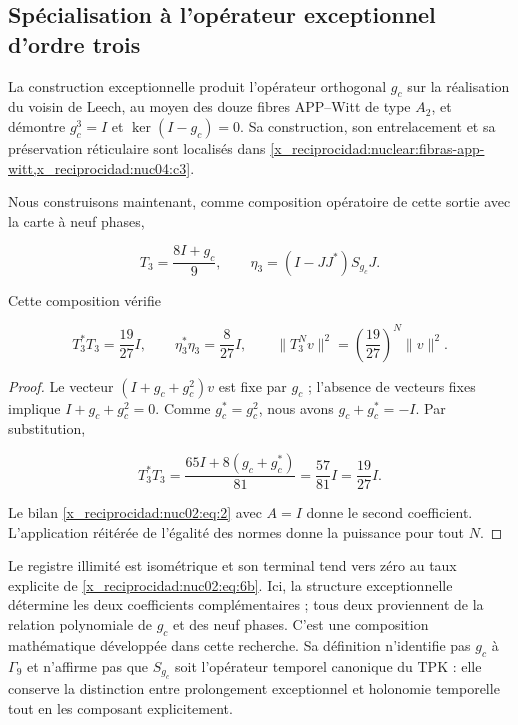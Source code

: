 \subsection{Spécialisation à l’opérateur exceptionnel d’ordre trois}

La construction exceptionnelle produit l’opérateur orthogonal \(g_c\) sur la réalisation du voisin de Leech, au moyen des douze fibres APP–Witt de type \(A_2\), et démontre \(g_c^3=I\) et \(\ker(I-g_c)=0\). Sa construction, son entrelacement et sa préservation réticulaire sont localisés dans \cref{x_reciprocidad:nuclear:fibras-app-witt,x_reciprocidad:nuc04:c3}.

Nous construisons maintenant, comme composition opératoire de cette sortie avec la carte à neuf phases,

\[
T_3=\frac{8I+g_c}{9},\qquad
\eta_3=(I-JJ^*)S_{g_c}J.
\]

\begin{corollary}
Cette composition vérifie

\begin{equation}
\boxed{T_3^*T_3=\frac{19}{27}I,\qquad
\eta_3^*\eta_3=\frac8{27}I,\qquad
\|T_3^Nv\|^2=\left(\frac{19}{27}\right)^N\|v\|^2.}\label{x_reciprocidad:nuc02:eq:6b}
\end{equation}
\end{corollary}

\begin{proof}
Le vecteur \((I+g_c+g_c^2)v\) est fixe par \(g_c\) ; l’absence de vecteurs fixes implique \(I+g_c+g_c^2=0\). Comme \(g_c^*=g_c^2\), nous avons \(g_c+g_c^*=-I\). Par substitution,

\[
T_3^*T_3=\frac{65I+8(g_c+g_c^*)}{81}
=\frac{57}{81}I=\frac{19}{27}I.
\]

Le bilan \eqref{x_reciprocidad:nuc02:eq:2} avec \(A=I\) donne le second coefficient. L’application réitérée de l’égalité des normes donne la puissance pour tout \(N\).
\end{proof}

Le registre illimité est isométrique et son terminal tend vers zéro au taux explicite de \eqref{x_reciprocidad:nuc02:eq:6b}. Ici, la structure exceptionnelle détermine les deux coefficients complémentaires ; tous deux proviennent de la relation polynomiale de \(g_c\) et des neuf phases. C’est une composition mathématique développée dans cette recherche. Sa définition n’identifie pas \(g_c\) à \(\Gamma_9\) et n’affirme pas que \(S_{g_c}\) soit l’opérateur temporel canonique du TPK : elle conserve la distinction entre prolongement exceptionnel et holonomie temporelle tout en les composant explicitement.


